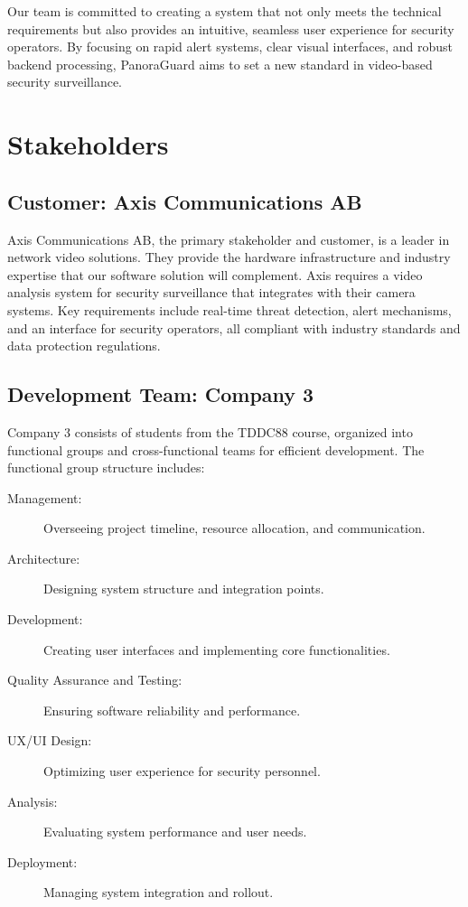 Our team is committed to creating a system that not only meets the technical requirements but also provides an intuitive, seamless user experience for security operators. By focusing on rapid alert systems, clear visual interfaces, and robust backend processing, PanoraGuard aims to set a new standard in video-based security surveillance.
    
\section{Stakeholders}
    
\subsection{Customer: Axis Communications AB}
Axis Communications AB, the primary stakeholder and customer, is a leader in network video solutions. They provide the hardware infrastructure and industry expertise that our software solution will complement. Axis requires a video analysis system for security surveillance that integrates with their camera systems. Key requirements include real-time threat detection, alert mechanisms, and an interface for security operators, all compliant with industry standards and data protection regulations.
    
\subsection{Development Team: Company 3}
Company 3 consists of students from the TDDC88 course, organized into functional groups and cross-functional teams for efficient development. The functional group structure includes:
    
\begin{description}
    \item[Management:] Overseeing project timeline, resource allocation, and communication.
    \item[Architecture:] Designing system structure and integration points.
    \item[Development:] Creating user interfaces and implementing core functionalities.
    \item[Quality Assurance and Testing:] Ensuring software reliability and performance.
    \item[UX/UI Design:] Optimizing user experience for security personnel.
    \item[Analysis:] Evaluating system performance and user needs.
    \item[Deployment:] Managing system integration and rollout. 
\end{description}
    

